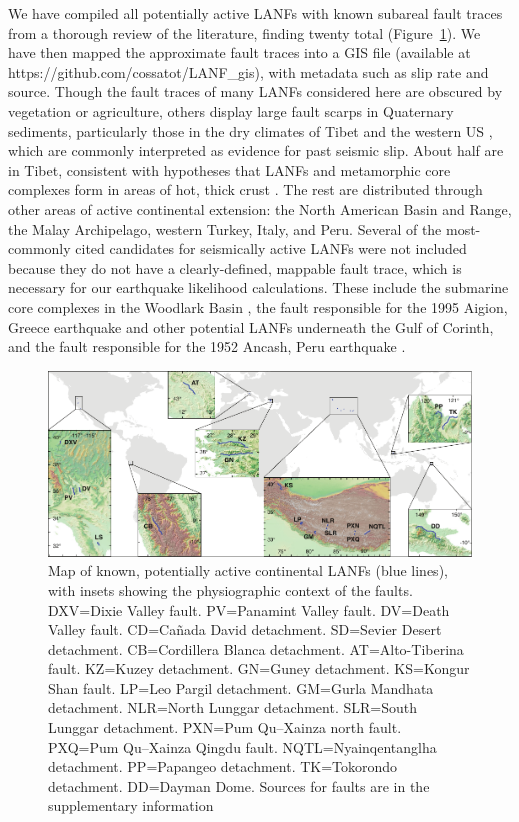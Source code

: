 \documentclass[twocolumn,grl]{AGUTeX}
\begin{document}
\begin{article}
We have compiled all potentially active LANFs with known subareal
fault traces from a thorough review of the literature, finding twenty
total (Figure~\ref{fig:lanf_map}).  We have then mapped the approximate fault
traces into a GIS file (available at https://github.com/cossatot/LANF\_gis), 
with metadata such as slip rate and source. Though the fault traces of many
LANFs considered here are obscured by vegetation or agriculture, others
display large fault scarps in Quaternary sediments, particularly those in the
dry climates of Tibet \citep[e.g.,][]{styron2013slr, kapp2005nqtl} and the
western US \citep[e.g.,][]{axen1999baja, hayman2003dv}, which are commonly
interpreted as evidence for past seismic slip.  About half are in Tibet,
consistent with hypotheses that LANFs and metamorphic core complexes
form in areas of hot, thick crust \citep [e.g.,][]{buck1991mcc}.  The
rest are distributed through other areas of active continental
extension: the North American Basin and Range, the Malay Archipelago,
western Turkey, Italy, and Peru. Several of the most-commonly cited
candidates for seismically active LANFs were not included because they
do not have a clearly-defined, mappable fault trace, which is
necessary for our earthquake likelihood calculations.  These include the 
submarine core complexes in the Woodlark Basin \citep{abers2001}, the fault
responsible for the 1995 Aigion, Greece earthquake \citep{bernard1997}
and other potential LANFs underneath the Gulf of Corinth, and the
fault responsible for the 1952 Ancash, Peru earthquake
\citep{doser1987ancash}.


\begin{figure}
\noindent\includegraphics[width=40pc]{./figures/active_lanfs_map_insets.pdf}
\caption{Map of known, potentially active continental LANFs (blue lines), with insets showing the physiographic context of the faults.  DXV=Dixie Valley fault.  PV=Panamint Valley fault.  DV=Death Valley fault.  CD=Ca\~nada David detachment.  SD=Sevier Desert detachment.  CB=Cordillera Blanca detachment.  AT=Alto-Tiberina fault.  KZ=Kuzey detachment.  GN=Guney detachment.  KS=Kongur Shan fault.  LP=Leo Pargil detachment.  GM=Gurla Mandhata detachment. NLR=North Lunggar detachment.  SLR=South Lunggar detachment.  PXN=Pum Qu--Xainza north fault.  PXQ=Pum Qu--Xainza Qingdu fault.  NQTL=Nyainqentanglha detachment.  PP=Papangeo detachment.  TK=Tokorondo detachment.  DD=Dayman Dome.  Sources for faults are in the 
supplementary information}
\label{fig:lanf_map}
\end{figure}



\end{article}
\end{document}

